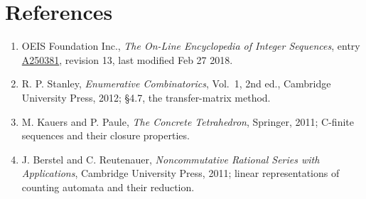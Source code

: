 \documentclass[11pt]{article}
\theoremstyle{definition}
\begin{document}
\section{References}

\begin{enumerate}

\item OEIS Foundation Inc., \emph{The On-Line Encyclopedia of Integer Sequences}, entry \href{https://oeis.org/A250381}{A250381}, revision 13, last modified Feb 27 2018.

\item R. P. Stanley, \emph{Enumerative Combinatorics}, Vol.~1, 2nd ed., Cambridge University Press, 2012; \S4.7, the transfer-matrix method.

\item M. Kauers and P. Paule, \emph{The Concrete Tetrahedron}, Springer, 2011; C-finite sequences and their closure properties.

\item J. Berstel and C. Reutenauer, \emph{Noncommutative Rational Series with Applications}, Cambridge University Press, 2011; linear representations of counting automata and their reduction.

\end{enumerate}
\end{document}
